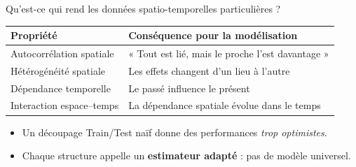 \documentclass[aspectratio=169,11pt]{beamer}
\begin{document}
\begin{frame}{Qu'est-ce qui rend les données spatio-temporelles particulières ?}
\footnotesize
\begin{tabularx}{\textwidth}{>{\RaggedRight\arraybackslash}p{} >{\RaggedRight\arraybackslash}X}
\toprule
\textbf{Propriété} & \textbf{Conséquence pour la modélisation} \\
\midrule
Autocorrélation spatiale & « Tout est lié, mais le proche l'est davantage » \\
Hétérogénéité spatiale & Les effets changent d'un lieu à l'autre \\
Dépendance temporelle & Le passé influence le présent \\
Interaction espace--temps & La dépendance spatiale évolue dans le temps \\
\bottomrule
\end{tabularx}
\vspace{0.3cm}
\begin{itemize}
    \item Un découpage Train/Test naïf donne des performances \emph{trop optimistes}.
    \item Chaque structure appelle un \textbf{estimateur adapté} : pas de modèle universel.
\end{itemize}
\end{frame}
\end{document}
